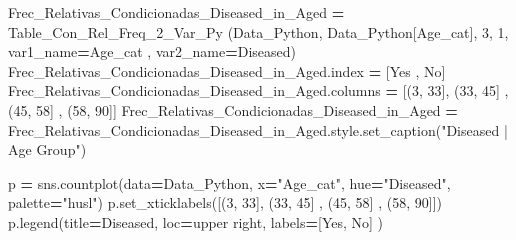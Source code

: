 \documentclass[
  11pt,
  a4paper,
]{article}
\newenvironment{Shaded}{\begin{snugshade}}{\end{snugshade}}
\newcommand{\DecValTok}[1]{\textcolor[rgb]{0.00,0.00,0.81}{#1}}
\newcommand{\NormalTok}[1]{#1}
\newcommand{\OperatorTok}[1]{\textcolor[rgb]{0.81,0.36,0.00}{\textbf{#1}}}
\newcommand{\StringTok}[1]{\textcolor[rgb]{0.31,0.60,0.02}{#1}}
\begin{document}
\begin{Shaded}
\begin{Highlighting}[]
\NormalTok{Frec\_Relativas\_Condicionadas\_Diseased\_in\_Aged }\OperatorTok{=}\NormalTok{ Table\_Con\_Rel\_Freq\_2\_Var\_Py (Data\_Python, Data\_Python[}\StringTok{\textquotesingle{}Age\_cat\textquotesingle{}}\NormalTok{], }\DecValTok{3}\NormalTok{, }\DecValTok{1}\NormalTok{, var1\_name}\OperatorTok{=}\StringTok{\textquotesingle{}Age\_cat\textquotesingle{}}\NormalTok{ , var2\_name}\OperatorTok{=}\StringTok{\textquotesingle{}Diseased\textquotesingle{}}\NormalTok{)}
\NormalTok{Frec\_Relativas\_Condicionadas\_Diseased\_in\_Aged.index }\OperatorTok{=}\NormalTok{ [}\StringTok{\textquotesingle{}Yes\textquotesingle{}}\NormalTok{ , }\StringTok{\textquotesingle{}No\textquotesingle{}}\NormalTok{]}
\NormalTok{Frec\_Relativas\_Condicionadas\_Diseased\_in\_Aged.columns }\OperatorTok{=}\NormalTok{ [}\StringTok{\textquotesingle{}(3, 33]\textquotesingle{}}\NormalTok{, }\StringTok{\textquotesingle{}(33, 45]\textquotesingle{}}\NormalTok{ , }\StringTok{\textquotesingle{}(45, 58]\textquotesingle{}}\NormalTok{ , }\StringTok{\textquotesingle{}(58, 90]\textquotesingle{}}\NormalTok{]}
\NormalTok{Frec\_Relativas\_Condicionadas\_Diseased\_in\_Aged }\OperatorTok{=}\NormalTok{ Frec\_Relativas\_Condicionadas\_Diseased\_in\_Aged.style.set\_caption(}\StringTok{"Diseased | Age Group"}\NormalTok{)}
\end{Highlighting}
\end{Shaded}

\begin{Shaded}
\begin{Highlighting}[]
\NormalTok{p }\OperatorTok{=}\NormalTok{ sns.countplot(data}\OperatorTok{=}\NormalTok{Data\_Python, x}\OperatorTok{=}\StringTok{"Age\_cat"}\NormalTok{, hue}\OperatorTok{=}\StringTok{"Diseased"}\NormalTok{, palette}\OperatorTok{=}\StringTok{"husl"}\NormalTok{)}
\NormalTok{p.set\_xticklabels([}\StringTok{\textquotesingle{}(3, 33]\textquotesingle{}}\NormalTok{, }\StringTok{\textquotesingle{}(33, 45]\textquotesingle{}}\NormalTok{ , }\StringTok{\textquotesingle{}(45, 58]\textquotesingle{}}\NormalTok{ , }\StringTok{\textquotesingle{}(58, 90]\textquotesingle{}}\NormalTok{])}
\NormalTok{p.legend(title}\OperatorTok{=}\StringTok{\textquotesingle{}Diseased\textquotesingle{}}\NormalTok{, loc}\OperatorTok{=}\StringTok{\textquotesingle{}upper right\textquotesingle{}}\NormalTok{, labels}\OperatorTok{=}\NormalTok{[}\StringTok{\textquotesingle{}Yes\textquotesingle{}}\NormalTok{, }\StringTok{\textquotesingle{}No\textquotesingle{}}\NormalTok{] )}
\end{Highlighting}
\end{Shaded}
\end{document}
